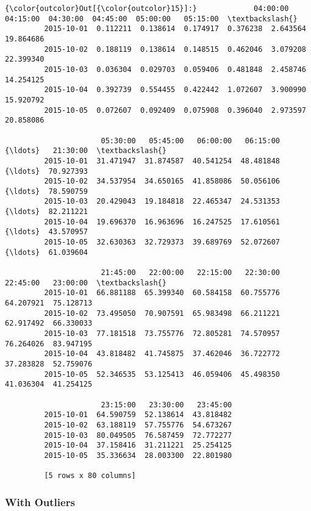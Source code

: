 \documentclass[11pt]{article}
\begin{document}
\begin{Verbatim}[commandchars=\\\{\}]
{\color{outcolor}Out[{\color{outcolor}15}]:}             04:00:00  04:15:00  04:30:00  04:45:00  05:00:00   05:15:00  \textbackslash{}
         2015-10-01  0.112211  0.138614  0.174917  0.376238  2.643564  19.864686   
         2015-10-02  0.188119  0.138614  0.148515  0.462046  3.079208  22.399340   
         2015-10-03  0.036304  0.029703  0.059406  0.481848  2.458746  14.254125   
         2015-10-04  0.392739  0.554455  0.422442  1.072607  3.900990  15.920792   
         2015-10-05  0.072607  0.092409  0.075908  0.396040  2.973597  20.858086   
         
                      05:30:00   05:45:00   06:00:00   06:15:00  {\ldots}   21:30:00  \textbackslash{}
         2015-10-01  31.471947  31.874587  40.541254  48.481848  {\ldots}  70.927393   
         2015-10-02  34.537954  34.650165  41.858086  50.056106  {\ldots}  78.590759   
         2015-10-03  20.429043  19.184818  22.465347  24.531353  {\ldots}  82.211221   
         2015-10-04  19.696370  16.963696  16.247525  17.610561  {\ldots}  43.570957   
         2015-10-05  32.630363  32.729373  39.689769  52.072607  {\ldots}  61.039604   
         
                      21:45:00   22:00:00   22:15:00   22:30:00   22:45:00   23:00:00  \textbackslash{}
         2015-10-01  66.881188  65.399340  60.584158  60.755776  64.207921  75.128713   
         2015-10-02  73.495050  70.907591  65.983498  66.211221  62.917492  66.330033   
         2015-10-03  77.181518  73.755776  72.805281  74.570957  76.264026  83.947195   
         2015-10-04  43.818482  41.745875  37.462046  36.722772  37.283828  52.759076   
         2015-10-05  52.346535  53.125413  46.059406  45.498350  41.036304  41.254125   
         
                      23:15:00   23:30:00   23:45:00  
         2015-10-01  64.590759  52.138614  43.818482  
         2015-10-02  63.188119  57.755776  54.673267  
         2015-10-03  80.049505  76.587459  72.772277  
         2015-10-04  37.158416  31.211221  25.254125  
         2015-10-05  35.336634  28.003300  22.801980  
         
         [5 rows x 80 columns]
\end{Verbatim}
            
    \subsubsection{With Outliers}\label{with-outliers}
\end{document}
